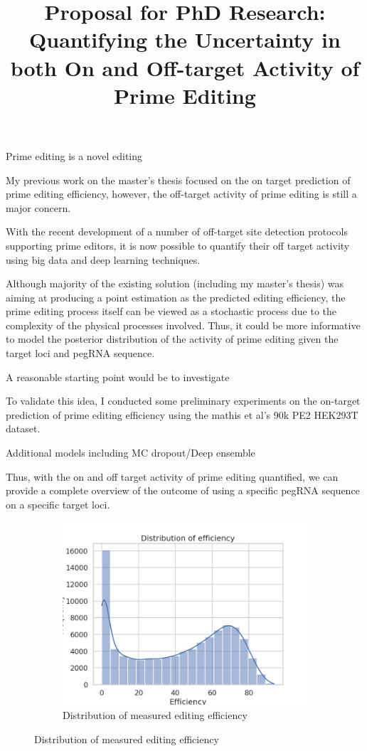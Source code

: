 \documentclass[a4,12pt]{article}
\title{Proposal for PhD Research: 
Quantifying the Uncertainty in both On and Off-target Activity of Prime Editing}
\author{}
\date{}
\begin{document}
\maketitle

Prime editing is a novel editing 

My previous work on the master's thesis focused on the on target prediction of prime editing efficiency, however, the off-target activity of prime editing is still a major concern. 

With the recent development of a number of off-target site detection protocols supporting prime editors, it is now possible to quantify their off target activity using big data and deep learning techniques\parencite{liangGenomewideProfilingPrime2023,
zhuTrackingseqRevealsHeterogeneity2024}.

Although majority of the existing solution (including my master's thesis) was aiming at producing a point estimation as the predicted editing efficiency\parencite{mathisMachineLearningPrediction2024,yuPredictionEfficienciesDiverse2023,koeppelPredictionPrimeEditing2023}, the prime editing process itself can be viewed as a stochastic process due to the complexity of the physical processes involved. Thus, it could be more informative to model the posterior distribution of the activity of prime editing given the target loci and pegRNA sequence.

A reasonable starting point would be to investigate 

To validate this idea, I conducted some preliminary experiments on the on-target prediction of prime editing efficiency using the mathis et al's 90k PE2 HEK293T dataset\parencite{mathisPredictingPrimeEditing2023}.


Additional models including MC dropout/Deep ensemble

Thus, with the on and off target activity of prime editing quantified, we can provide a complete overview of the outcome of using a specific pegRNA sequence on a specific target loci. 

\begin{figure}
    \centering
    \begin{subfigure}{0.3\textwidth}
        \includegraphics[width=\textwidth]{efficiency_distribution.png}
        \caption{Distribution of measured editing efficiency}
    \end{subfigure}
\end{figure}

\printbibliography
\end{document}
